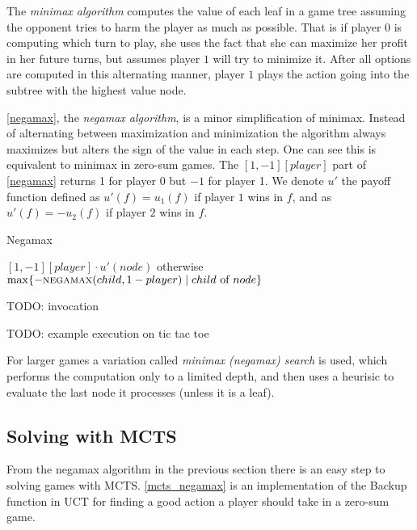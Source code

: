 The {\em minimax algorithm} computes the value of each leaf in a game
tree assuming the opponent tries to harm the player as much as
possible. That is if player $0$ is computing which turn to play,
she uses the fact that she can maximize her profit in her future turns,
but assumes player $1$ will try to minimize it.
After all options are computed in this alternating manner,
player $1$ plays the action going into the subtree with the highest value node.

\autoref{negamax}, the {\em negamax algorithm}, is a minor simplification
of minimax.
Instead of
alternating between maximization and minimization the algorithm always
maximizes but alters the sign of the value in each step. One can see
this is equivalent to minimax in zero-sum games.
The $[1,-1][player]$ part of
\autoref{negamax} returns 1 for player 0 but $-1$ for player 1.
We denote $u'$ the payoff function defined as $u'(f) = u_1(f)$ if
player $1$ wins in $f$, and as $u'(f) = -u_2(f)$ if player $2$ wins in
$f$.


\begin{algorithm}
\caption{Negamax}
\label{negamax}
\begin{algorithmic}
    \State \Return $[1,-1][player] \cdot u'(node)$
        otherwise
    \EndIf
    \State \Return $\max \{ - \Call{negamax}{child, 1 - player}
        \mid child \text{ of } node \}$
\EndFunction
\end{algorithmic}
\end{algorithm}


TODO: invocation

TODO: example execution on tic tac toe

For larger games a variation called {\em minimax (negamax) search} is used, which
performs the computation only to a limited depth, and then uses
a heurisic to evaluate the last node it processes (unless it is a leaf).

\subsection{Solving with MCTS}

From the negamax algorithm in the previous section there is an easy step
to solving games with MCTS. \autoref{mcts_negamax} is an
implementation of the Backup function in UCT for finding a good
action a player should take in a zero-sum game.

